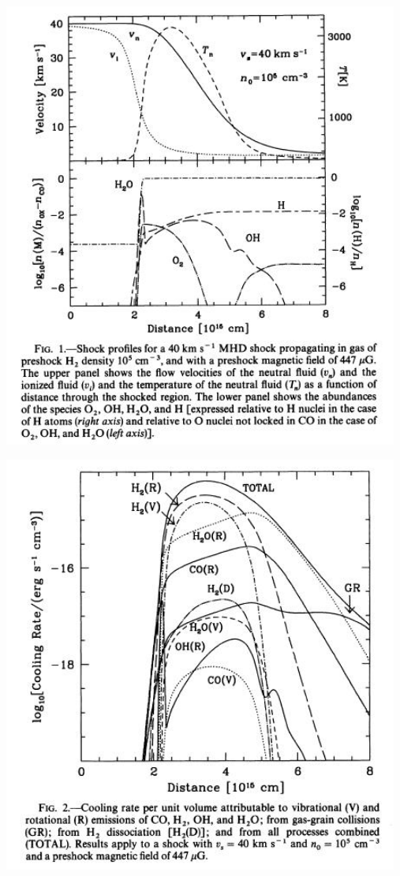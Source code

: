 \begin{minipage}[t]{13cm}
  \begin{center}
    \includegraphics[width=13cm,height=!]{./E/Fig1_Kaufman_Neufeld.jpg}
    \end{center}
\end{minipage}
\begin{minipage}[t]{13cm}
  \begin{center}
    \includegraphics[width=13cm,height=!]{./E/Fig2_Kaufman_Neufeld.jpg}
    \end{center}
\end{minipage}


